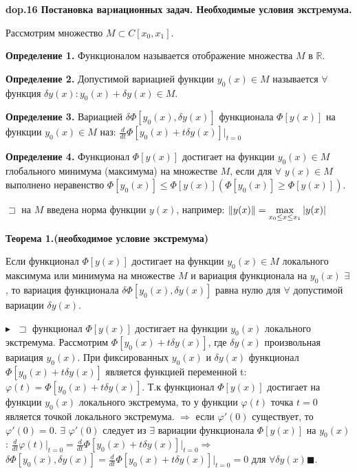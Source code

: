 \setcounter{section}{4}
\setcounter{subsection}{16}
\setcounter{equation}{0}
\textbf{\LARGE dop.16 Постановка ваpиационных задач. Необходимые условия экстpемума.}

Рассмотрим множество $M \subset C[x_0, x_1]$.


\textbf{Определение 1.}
Функционалом называется отображение множества $M$ в $\mathbb{R}$.

\textbf{Определение 2.}
Допустимой вариацией функции $y_0(x) \in M$ называется $\forall$ функция $\delta y(x):y_0(x) + \delta y(x) \in M$.

\textbf{Определение 3.}
Вариацией $\delta\Phi[y_0(x), \delta y(x)]$ функционала
$\Phi[y(x)]$ на функции $y_0(x) \in M$ наз: $\frac{d}{dt}\Phi[y_0(x)+t\delta y(x)]\Big|_{t=0}$

\textbf{Определение 4.}
Функционал $\Phi[y(x)]$ достигает на функции
$y_0(x) \in M$ глобального минимума (максимума) на множестве $M$, если для $\forall$ $y(x) \in M$ выполнено неравенство $\Phi[y_0(x)]\leq\Phi[y(x)]  (\Phi[y_0(x)]\geq\Phi[y(x)])$.


$\sqsupset$ на  $M$ введена норма функции $y(x)$, например:
$\|y(x)\|=\displaystyle\max_{x_0\leq x \leq x_1} |y(x)|$


\textbf{Теорема 1.(необходимое условие экстремума)}

    Если функционал $\Phi[y(x)]$ достигает на функции
    $y_0(x) \in M$ локального максимума или минимума на множестве $M$ и
    вариация функционала на $y_0(x)$ $\exists$, то вариация функционала $\delta\Phi[y_0(x), \delta y(x)]$ равна нулю для $\forall$ допустимой вариации $\delta y(x)$.
    
$\blacktriangleright\;$
    $\sqsupset$ функционал $\Phi[y(x)]$ достигает на функции
    $y_0(x)$ локального экстремума. Рассмотрим $\Phi[y_0(x) + t\delta y(x)]$, где $\delta y(x)$
    произвольная вариация $y_0(x)$. При фиксированных $y_0(x)$ и $\delta y(x)$ функционал 
    $\Phi[y_0(x) + t\delta y(x)]$ является функцией переменной t:
    $\varphi(t) = \Phi[y_0(x) + t\delta y(x)].$
    Т.к  функционал $\Phi[y(x)]$ достигает на функции $y_0(x)$ локального
    экстремума, то у функции $\varphi(t)$ точка $t=0$ является точкой локального экстремума. $\Longrightarrow$ если $\varphi'(0)$ существует, то
    $\varphi'(0)=0$. $\exists$ $\varphi'(0)$ следует из $\exists$ вариации функционала $\Phi[y(x)]$ на $y_0(x)$: $\frac{d}{dt}\varphi(t)\Big|_{t=0}=\frac{d}{dt}\Phi[y_0(x)+t\delta y(x)]\Big|_{t=0} \Longrightarrow$
    $\delta \Phi[y_0(x), \delta y(x)]=\frac{d}{dt}\Phi[y_0(x)+t\delta y(x)]\Big|_{t=0}=0 \text{ для } \forall \delta y(x)$$\blacksquare$.


